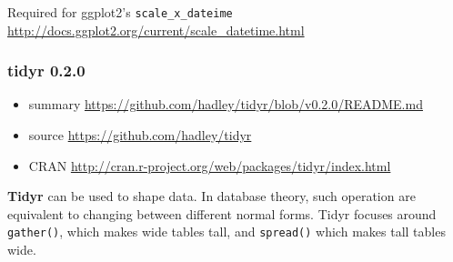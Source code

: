 \documentclass[]{article}
\begin{document}
Required for ggplot2's \texttt{scale\_x\_dateime}
\url{http://docs.ggplot2.org/current/scale_datetime.html}

\subsubsection{tidyr 0.2.0}\label{tidyr-0.2.0}

\begin{itemize}
\itemsep1pt\parskip0pt
\item
  summary \url{https://github.com/hadley/tidyr/blob/v0.2.0/README.md}
\item
  source \url{https://github.com/hadley/tidyr}
\item
  CRAN \url{http://cran.r-project.org/web/packages/tidyr/index.html}
\end{itemize}

\textbf{Tidyr} can be used to shape data. In database theory, such
operation are equivalent to changing between different normal forms.
Tidyr focuses around \texttt{gather()}, which makes wide tables tall,
and \texttt{spread()} which makes tall tables wide.
\end{document}

